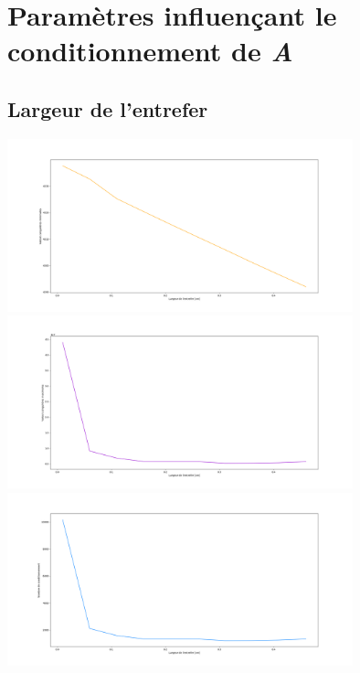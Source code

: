\documentclass{article}
\begin{document}
\section{Paramètres influençant le conditionnement de \textit{A}}
\subsection{Largeur de l'entrefer}
\begin{center}
    \includegraphics[width = 10cm]{influences/plots/gap_min.png}
    \includegraphics[width = 10cm]{influences/plots/gap_max.png}
    \includegraphics[width = 10cm]{influences/plots/gap_k.png}
\end{center}
\end{document}
